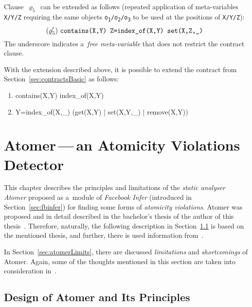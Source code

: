 Clause~$ \varrho_5 $~can be extended as follows (repeated application of
meta-variables \texttt{X/Y/Z} requiring the same objects
\texttt{o\textsubscript{1}/o\textsubscript{2}/o\textsubscript{3}} to be used
at the positions of \texttt{X/Y/Z}):
$$
    (\varrho'_5)\ \text{\texttt{%
        contains(X,Y) Z=index\_of(X,Y) set(X,Z,\_)
    }}
$$
The underscore indicates a~\emph{free meta-variable} that does not restrict
the contract clause.

With the extension described above, it is possible to extend the contract
from Section~\ref{sec:contractsBasic} as follows:
\begin{enumerate}[label={$ (\varrho'_{\arabic*}) $}]
    \tt

    \item contains(X,Y) index\_of(X,Y)
    \item Y=index\_of(X,\_) (get(X,Y) | set(X,Y,\_) | remove(X,Y))
\end{enumerate}



\chapter{\texorpdfstring{Atomer\,---\,an Atomicity Violations Detector}{%
    Atomer - an Atomicity Violations Detector%
}}
\label{chap:atomer}

This chapter describes the principles and limitations of the \emph{static
analyser} \emph{Atomer} proposed as a~module of \emph{Facebook Infer}
(introduced in Section~\ref{sec:fbinfer}) for finding some forms of
\emph{atomicity violations}. Atomer was proposed and in detail described in the
bachelor's thesis of the author of this thesis~\cite{harmimBP}. Therefore,
naturally, the following description in Section~\ref{sec:atomerDesing} is based
on the mentioned thesis, and further, there is used information
from~\cite{ppHarmim2020, excel2019FBInfer}.

In Section~\ref{sec:atomerLimits}, there are discussed \emph{limitations} and
\emph{shortcomings} of Atomer. Again, some of the thoughts mentioned in this
section are taken into consideration in~\cite{harmimBP, ppHarmim2020,
excel2019FBInfer}.


\section{Design of Atomer and Its Principles}
\label{sec:atomerDesing}

